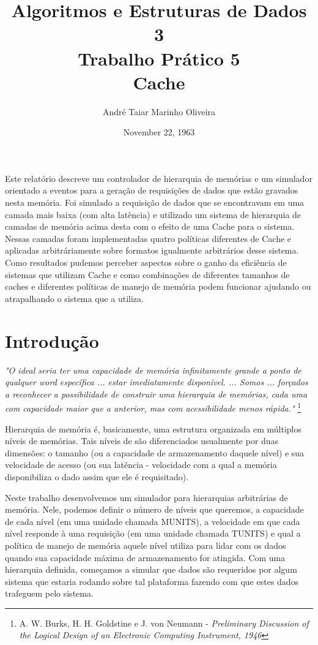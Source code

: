 \documentclass[12pt]{article}
\title{Algoritmos e Estruturas de Dados 3 \\ Trabalho Prático 5 \\
\huge{Cache}}
\date{November 22, 1963}
\author{André Taiar Marinho Oliveira}
\begin{document}
\maketitle

\begin{resumo}
\label{resumo}
Este relatório descreve um controlador de hierarquia de memórias e um simulador orientado
a eventos para a geração de requisições de dados que estão gravados nesta memória. Foi simulado 
a requisição de dados que se encontravam em uma camada mais baixa (com alta latência) e utilizado 
um sistema de hierarquia de camadas de memória acima desta com o efeito de uma Cache para o sistema. 
Nessas camadas foram implementadas quatro políticas diferentes de Cache e aplicadas arbitráriamente 
sobre formatos igualmente arbitrários desse sistema. Como resultados pudemos perceber aspectos sobre 
o ganho da eficiência de sistemas que utilizam Cache e como combinações de diferentes tamanhos de caches 
e diferentes políticas de manejo de memória podem funcionar ajudando ou atrapalhando o sistema que a 
utiliza.
\end{resumo}

\section{Introdução}
\label{introducao}
\textit{"O ideal seria ter uma capacidade de memória infinitamente grande a ponto de qualquer word
específica ... estar imediatamente disponível. ... Somos ... forçados a reconhecer a possibilidade de 
construir uma hierarquia de memórias, cada uma com capacidade maior que a anterior, mas com acessibilidade
menos rápida."} \footnote{A. W. Burks, H. H. Goldstine e J. von Neumann - \textit{Preliminary Discussion of the 
Logical Design of an Electronic Computing Instrument, 1946}}

Hierarquia de memória é, basicamente, uma estrutura organizada em múltiplos níveis de memórias. Tais níveis 
de são diferenciados usualmente por duas dimensões: o tamanho (ou a capacidade de armazenamento daquele
nível) e sua velocidade de acesso (ou sua latência - velocidade com a qual a memória disponibiliza o dado 
assim que ele é requisitado).

Neste trabalho desenvolvemos um simulador para hierarquias arbitrárias de memória. Nele, podemos definir o número 
de níveis que queremos, a capacidade de cada nível (em uma unidade chamada MUNITS), a velocidade em que cada nível 
responde à uma requisição (em uma unidade chamada TUNITS) e qual a política de manejo de memória aquele nível utiliza
para lidar com os dados quando sua capacidade máxima de armazenamento for atingida. Com uma hierarquia definida, 
começamos a simular que dados são requeridos por algum sistema que estaria rodando sobre tal plataforma fazendo 
com que estes dados trafeguem pelo sistema.
\end{document}
